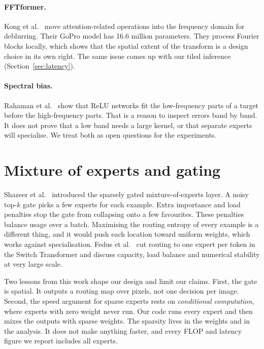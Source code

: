 \paragraph{FFTformer.} Kong et al.\ \cite{kong2023fftformer} move
attention-related operations into the frequency domain for deblurring. Their
GoPro model has 16.6 million parameters. They process Fourier blocks locally,
which shows that the spatial extent of the transform is a design choice in
its own right. The same issue comes up with our tiled inference
(Section~\ref{sec:latency}).

\paragraph{Spectral bias.} Rahaman et al.\ \cite{rahaman2019spectral} show
that ReLU networks fit the low-frequency parts of a target before the
high-frequency parts. That is a reason to inspect errors band by band. It
does not prove that a low band needs a large kernel, or that separate experts
will specialise. We treat both as open questions for the experiments.

\section{Mixture of experts and gating}\label{sec:lit-moe}

Shazeer et al.\ \cite{shazeer2017moe} introduced the sparsely gated
mixture-of-experts layer. A noisy top-$k$ gate picks a few experts for each
example. Extra importance and load penalties stop the gate from collapsing
onto a few favourites. These penalties balance usage over a batch. Maximising
the routing entropy of every example is a different thing, and it would push
each location toward uniform weights, which works against specialisation.
Fedus et al.\ \cite{fedus2022switch} cut routing to one expert per token in
the Switch Transformer and discuss capacity, load balance and numerical
stability at very large scale.

Two lessons from this work shape our design and limit our claims. First, the
\fcsg{} gate is spatial. It outputs a routing map over pixels, not one
decision per image. Second, the speed argument for sparse experts rests on
\emph{conditional computation}, where experts with zero weight never run. Our
code runs every expert and then mixes the outputs with sparse weights. The
sparsity lives in the weights and in the analysis. It does not make anything
faster, and every FLOP and latency figure we report includes all experts.

